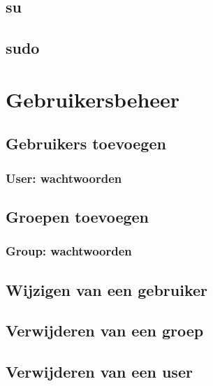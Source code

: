 \documentclass[a4paper,12pt,twoside,openright,titlepage]{book}
\begin{document}
\section{su}

\section{sudo}

\chapter{Gebruikersbeheer}
\section{Gebruikers toevoegen}

\subsection{User: wachtwoorden}
\section{Groepen toevoegen}

\subsection{Group: wachtwoorden}

\section{Wijzigen van een gebruiker}

\section{Verwijderen van een groep}

\section{Verwijderen van een user}


\backmatter
\printindex
\end{document}
